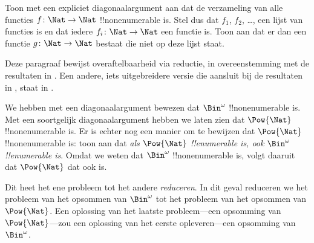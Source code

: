 \documentclass[openany]{memoir}
\begin{document}
\begin{prob}
Toon met een expliciet diagonaalargument aan dat de verzameling van
alle functies $f \colon \Nat \to \Nat$ !!{nonenumerable} is. Stel dus
dat $f_1$, $f_2$, \dots, een lijst van functies is en dat iedere
$f_i\colon \Nat \to \Nat$ een functie is. Toon aan dat er dan een
functie $g \colon \Nat \to \Nat$ bestaat die niet op deze lijst staat.
\end{prob}
\endgroup

\begingroup
\def\olfilename{OLP-0040}
\def\olfilepath{content/sets-functions-relations/size-of-sets/}
\hypertarget{unit-OLP-0040}{}





\begin{editorial}
  Deze paragraaf bewijst overaftelbaarheid via reductie, in
  overeenstemming met de resultaten in . Een
  andere, iets uitgebreidere versie die aansluit bij de resultaten in
  , staat in .
\end{editorial}

We hebben met een diagonaalargument bewezen dat $\Bin^\omega$
!!{nonenumerable} is. Met een soortgelijk diagonaalargument hebben we
laten zien dat $\Pow{\Nat}$ !!{nonenumerable} is. Er is echter nog een
manier om te bewijzen dat $\Pow{\Nat}$ !!{nonenumerable} is: toon aan
dat \emph{als $\Pow{\Nat}$ !!{enumerable} is, ook $\Bin^\omega$
!!{enumerable} is}. Omdat we weten dat $\Bin^\omega$
!!{nonenumerable} is, volgt daaruit dat $\Pow{\Nat}$ dat ook is.

Dit heet het ene probleem tot het andere \emph{reduceren}. In dit
geval reduceren we het probleem van het opsommen van $\Bin^\omega$ tot
het probleem van het opsommen van $\Pow{\Nat}$. Een oplossing van het
laatste probleem---een opsomming van $\Pow{\Nat}$---zou een oplossing
van het eerste opleveren---een opsomming van $\Bin^\omega$.
\end{document}
